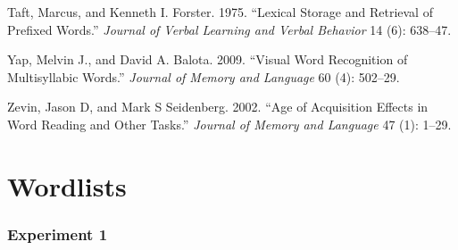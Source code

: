 \documentclass[
]{interact}
\newlength{\cslhangindent}
\newenvironment{CSLReferences}[2] %
 {\begin{list}{}{%
  \setlength{\itemindent}{0pt}
  \setlength{\leftmargin}{0pt}
  \setlength{\parsep}{0pt}
  \ifodd #1
   \setlength{\leftmargin}{\cslhangindent}
   \setlength{\itemindent}{-1\cslhangindent}
  \fi
  \setlength{\itemsep}{#2\baselineskip}}}
 {\end{list}}
\begin{document}
\begin{CSLReferences}{1}{0}
Taft, Marcus, and Kenneth I. Forster. 1975. {``Lexical Storage and
Retrieval of Prefixed Words.''} \emph{Journal of Verbal Learning and
Verbal Behavior} 14 (6): 638--47.

Yap, Melvin J., and David A. Balota. 2009. {``Visual Word Recognition of
Multisyllabic Words.''} \emph{Journal of Memory and Language} 60 (4):
502--29.

Zevin, Jason D, and Mark S Seidenberg. 2002. {``Age of Acquisition
Effects in Word Reading and Other Tasks.''} \emph{Journal of Memory and
Language} 47 (1): 1--29.

\end{CSLReferences}

\newpage

\section*{Wordlists}\label{wordlists}

\subsubsection*{Experiment 1}\label{experiment-1}
\end{document}
